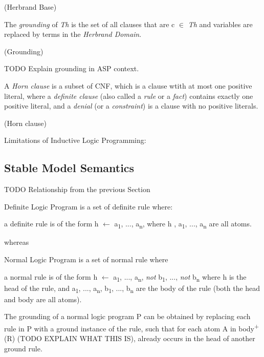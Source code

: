 \documentclass[12pt,twoside]{report}
\begin{document}
\begin{examp} (Herbrand Base)

\end{examp}

The \textit{grounding} of \textit{Th} is the set of all clauses that are c $\in$ \textit{Th} and variables are replaced by terms in the \textit{Herbrand Domain}.

\begin{examp} (Grounding)

\end{examp}


TODO Explain grounding in ASP context.


A \textit{Horn clause} is a subset of CNF, which is a clause wtith at most one positive literal, where a \textit{definite clause} (also called a \textit{rule} or a \textit{fact}) contains exactly one positive literal, and a \textit{denial} (or a \textit{constraint}) is a clause with no positive literals.

\begin{examp} (Horn clause)

\end{examp}

Limitations of Inductive Logic Programming:

\subsection{Stable Model Semantics}

TODO Relationship from the previous Section

Definite Logic Program is a set of definite rule where: \newline

a definite rule is of the form h $\leftarrow$ a\textsubscript{1}, ..., a\textsubscript{n}, where h , a\textsubscript{1}, ..., a\textsubscript{n} are all atoms.

whereas

Normal Logic Program is a set of normal rule where

a normal rule is of the form h $\leftarrow$ a\textsubscript{1}, ..., a\textsubscript{n}, \textit{not} b\textsubscript{1}, ..., \textit{not}  b\textsubscript{n} where h is the head of the rule,
 and a\textsubscript{1}, ..., a\textsubscript{n}, b\textsubscript{1}, ..., b\textsubscript{n} are the body of the rule (both the head and body are all atoms).


The grounding of a normal logic program P can be obtained by replacing each rule in P with a ground instance of the rule, such that for each atom A in body\textsuperscript{+} (R) (TODO EXPLAIN WHAT THIS IS), already occurs in the head of another ground rule.
\end{document}

